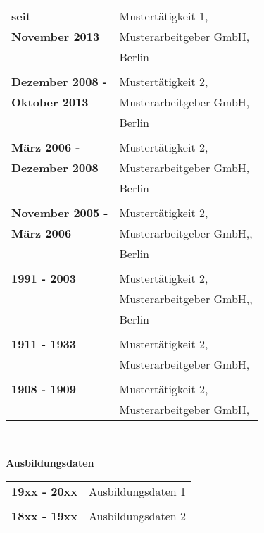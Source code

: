 \documentclass{article}
\begin{document}
\begin{minipage}[t]{0.4\textwidth}
\begin{tabular}{p{4cm}l}
\textbf{seit}								 & Mustertätigkeit 1,  \\
\textbf{November 2013}						 & Musterarbeitgeber GmbH,\\
  											 & Berlin  \\
  											 & \\
\textbf{Dezember 2008 -}					 & Mustertätigkeit 2,  \\
\textbf{Oktober 2013}						 & Musterarbeitgeber GmbH,\\
  											 & Berlin  \\
  											 & \\
\textbf{März 2006 -}						 & Mustertätigkeit 2,  \\
\textbf{Dezember 2008}						 & Musterarbeitgeber GmbH,  \\
  											 & Berlin  \\
  											 & \\
\textbf{November 2005 -}					 & Mustertätigkeit 2,  \\
\textbf{März 2006}							 & Musterarbeitgeber GmbH,,  \\
  											 & Berlin  \\  	
  											 & \\									  
\textbf{1991 - 2003}						 & Mustertätigkeit 2,  \\
  											 & Musterarbeitgeber GmbH,, \\
  											 & Berlin  \\	 
  											 & \\
\textbf{1911 - 1933}						 & Mustertätigkeit 2,  \\
  											 & Musterarbeitgeber GmbH, \\
  											 & \\
\textbf{1908 - 1909}						 & Mustertätigkeit 2,  \\
  											 & Musterarbeitgeber GmbH, \\
  											 
\end{tabular}\\
\vspace{1 cm}

{\Large \textbf{Ausbildungsdaten}}\\

\begin{tabular}{p{4cm}l}

\textbf{19xx - 20xx}						 & Ausbildungsdaten 1  \\
											 & \\
\textbf{18xx - 19xx}						 & Ausbildungsdaten 2 \\
					 
\end{tabular}
\end{minipage}\hspace{2.5 cm}
\end{document}
